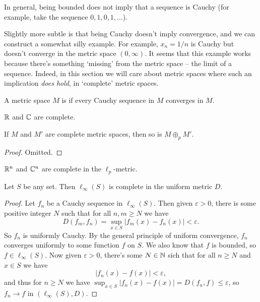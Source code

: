 \documentclass[a4paper]{scrartcl}
\begin{document}
In general, being bounded does not imply that a sequence is Cauchy (for example, take the sequence $0, 1, 0, 1, \dots$).

Slightly more subtle is that being Cauchy doesn't imply convergence, and we can construct a somewhat silly example. For example, $x_n = 1/n$ is Cauchy but doesn't converge in the metric space $(0, \infty)$.
It seems that this example works because there's something `missing' from the metric space -- the limit of a sequence. Indeed, in this section we will care about metric spaces where such an implication \emph{does hold}, in `complete' metric spaces.

\begin{definition}[Completeness]
    A metric space $M$ is  if every Cauchy sequence in $M$ converges in $M$.
\end{definition}

\begin{example}
    $\mathbb{R}$ and $\mathbb{C}$ are complete.
\end{example}

\begin{proposition}
    If $M$ and $M'$ are complete metric spaces, then so is $M \oplus_p M'$.
\end{proposition}
\begin{proof}
    Omitted.
\end{proof}

\begin{example}
    $\mathbb{R}^n$ and $\mathbb{C}^n$ are complete in the $\ell_p$-metric.
\end{example}


\begin{theorem}
    Let $S$ be any set. Then $\ell_{\infty}(S)$ is complete in the uniform metric $D$.
\end{theorem}
\begin{proof}
    Let $f_n$ be a Cauchy sequence in $\ell_{\infty}(S)$. Then given $\varepsilon> 0$, there is some positive integer $N$ such that for all $n, m \geq N$ we have
    $$
    D(f_m, f_n) = \sup_{x \in S} |f_m(x) - f_n(x)| < \varepsilon.
    $$
    So $f_n$ is uniformly Cauchy. By the general principle of uniform convergence, $f_n$ converges uniformly to some function $f$ on $S$.
    We also know that $f$ is bounded, so $f \in \ell_{\infty}(S)$. 
    Now given $\varepsilon > 0$, there's some $N \in \mathbb{N}$ sich that for all $n \geq N$ and $x \in S$ we have
    $$
    |f_n(x) - f(x)| < \varepsilon,
    $$
    and thus for $n \geq N$ we have $\sup_{x \in S} |f_n(x) - f(x)| = D(f_n, f) \leq \varepsilon$, so $f_n \rightarrow f$ in $(\ell_{\infty}(S), D)$.
\end{proof}
\end{document}
